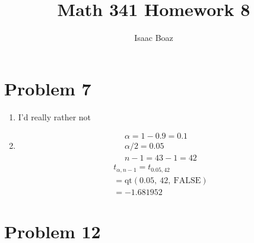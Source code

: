 \documentclass{article}
\title{\vspace{-4ex}Math 341 Homework 8}
\author{Isaac Boaz}
\begin{document}
\maketitle
\section*{Problem 7}
\begin{enumerate}[label=(\alph*)]
    \item I'd really rather not
    \item \begin{align*}
              \alpha = 1 - 0.9 = 0.1 \\
              \alpha/2 = 0.05        \\
              n - 1 = 43 - 1 = 42
          \end{align*}
          \begin{align*}
              t_{\alpha, n-1} = t_{0.05, 42}        \\
              = \text{qt}(0.05,\ 42,\ \text{FALSE}) \\
              = -1.681952
          \end{align*}
\end{enumerate}

\pagebreak
\section*{Problem 12}
\pagebreak
\end{document}
